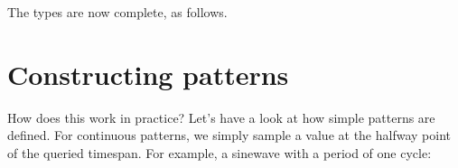 The types are now complete, as follows.

\begin{Shaded}
\begin{Highlighting}[]
  \OtherTok{=} 
  \OtherTok{=} \NormalTok{ \{} \NormalTok{,} \NormalTok{\}}
     
 \OtherTok{=} \NormalTok{ \{}  \NormalTok{,} \NormalTok{,}
    \NormalTok{ (}\NormalTok{, }\NormalTok{)}
 \OtherTok{=} \NormalTok{ \{}  \OtherTok{{-}\textgreater{}}\NormalTok{ [}\NormalTok{ a]\}}
    \NormalTok{ (}\NormalTok{)}
\end{Highlighting}
\end{Shaded}

\section{Constructing patterns}\label{constructing-patterns}

How does this work in practice? Let's have a look at how simple patterns
are defined. For continuous patterns, we simply sample a value at the
halfway point of the queried timespan. For example, a sinewave with a
period of one cycle:

\begin{Shaded}
\begin{Highlighting}[]
  
\OtherTok{=}  \OperatorTok{$}\OtherTok{{-}\textgreater{}}
\NormalTok{  [} \OperatorTok{$}  \OperatorTok{$}\NormalTok{ (} \OperatorTok{$}\OperatorTok{*}  \OperatorTok{*} \NormalTok{]}
    \OtherTok{=}\OperatorTok{+}\OperatorTok{{-}}\OperatorTok{/} \NormalTok{)}
\end{Highlighting}
\end{Shaded}

